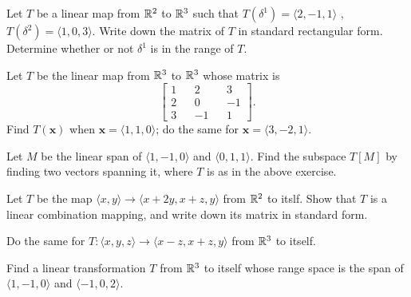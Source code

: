 \documentclass[../../main.tex]{subfiles}
\begin{document}
\begin{problem}
	Let $T$ be a linear map from $\mathbb{R}^2$ to $\mathbb{R}^3$ such that $T(\delta^1) = \langle 2, -1, 1 \rangle$ , $T(\delta^2) = \langle 1,0,3 \rangle$. Write down the matrix of $T$ in standard rectangular form. Determine whether or not $\delta^1$ is in the range of $T$.	
\end{problem}
\begin{problem}
Let $T$ be the linear map from $\mathbb{R}^3$ to $\mathbb{R}^3$ whose matrix is
\[
\begin{bmatrix}
	1 && 2 && 3 \\	
	2 && 0 && -1 \\
	3 && -1 && 1
\end{bmatrix}.
\]
Find $T( \bm x)$ when $\bm x = \langle 1, 1, 0 \rangle$; do the same for $\bm x = \langle 3, -2, 1 \rangle$.
\end{problem}
\begin{problem}
	Let $M$ be the linear span of $\langle 1, -1, 0 \rangle$ and $\langle 0, 1, 1 \rangle$. Find the subspace $T[M]$ by finding two vectors spanning it, where $T$ is as in the above exercise.
\end{problem}
\begin{problem}
	Let $T$ be the map $\langle x, y \rangle \to \langle x+2y, x+z, y \rangle$ from $\mathbb{R}^2$ to itslf. Show that $T$ is a linear combination mapping, and write down its matrix in standard form.
\end{problem}
\begin{problem}
	
	Do the same for $T: \langle x, y , z \rangle \to \langle x-z, x+z,y \rangle$ from $\mathbb{R}^3$ to itself.
\end{problem}
\begin{problem}
	Find a linear transformation $T$ from $\mathbb{R}^3$ to itself whose range space is the span of $\langle1, -1, 0 \rangle$ and $\langle -1, 0 ,2 \rangle$.	
\end{problem}
\end{document}
